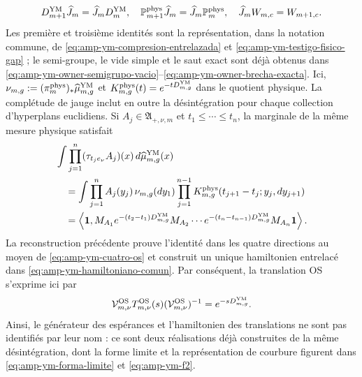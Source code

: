 \begin{equation}\label{eq:pdf2-g-gau-entrelazamiento-dato}
 D_{m+1}^{\rm YM}\widehat J_m=\widehat J_mD_m^{\rm YM},
 \quad
 \mathbb P_{m+1}^{\rm phys}\widehat J_m
  =\widehat J_m\mathbb P_m^{\rm phys},
 \quad
 \widehat J_mW_{m,c}=W_{m+1,c}.
\end{equation}
Les première et troisième identités sont la représentation, dans la notation commune, de \eqref{eq:amp-ym-compresion-entrelazada} et \eqref{eq:amp-ym-testigo-fisico-gap} ; le semi-groupe, le vide simple et le saut exact sont déjà obtenus dans \eqref{eq:amp-ym-owner-semigrupo-vacio}--\eqref{eq:amp-ym-owner-brecha-exacta}. Ici, $\nu_{m,g}:=(\pi_m^{\rm phys})_*\widehat\mu_{m,g}^{\rm YM}$ et $K_{m,g}^{\rm phys}(t)=e^{-tD_{m,g}^{\rm YM}}$ dans le quotient physique. La complétude de jauge inclut en outre la désintégration pour chaque collection d'hyperplans euclidiens. Si $A_j\in\mathfrak A_{+,\nu,m}$ et $t_1\le\cdots\le t_n$, la marginale de la même mesure physique satisfait
\begin{equation}\label{eq:pdf2-g-gau-transfer-euclidean-dato}
\begin{aligned}
 &\int\prod_{j=1}^n
   (\tau_{t_je_\nu}A_j)(x)\,d\widehat\mu_{m,g}^{\rm YM}(x)\\
 &\quad=
 \int\prod_{j=1}^nA_j(y_j)\,
  \nu_{m,g}(dy_1)
  \prod_{j=1}^{n-1}K_{m,g}^{\rm phys}
       (t_{j+1}-t_j;y_j,dy_{j+1})\\
 &\quad=
 \left\langle\mathbf1,
  M_{A_1}e^{-(t_2-t_1)D_{m,g}^{\rm YM}}M_{A_2}\cdots
  e^{-(t_n-t_{n-1})D_{m,g}^{\rm YM}}M_{A_n}\mathbf1
 \right\rangle.
\end{aligned}
\end{equation}
La reconstruction précédente prouve l'identité dans les quatre directions au moyen de \eqref{eq:amp-ym-cuatro-os} et construit un unique hamiltonien entrelacé dans \eqref{eq:amp-ym-hamiltoniano-comun}. Par conséquent, la translation OS s'exprime ici par
\begin{equation}\label{eq:pdf2-g-gau-os-generator-dato}
 \mathcal V_{m,\nu}^{\rm OS}T_{m,\nu}^{\rm OS}(s)
 (\mathcal V_{m,\nu}^{\rm OS})^{-1}
 =e^{-sD_{m,g}^{\rm YM}}.
\end{equation}
Ainsi, le générateur des espérances et l'hamiltonien des translations ne sont pas identifiés par leur nom : ce sont deux réalisations déjà construites de la même désintégration, dont la forme limite et la représentation de courbure figurent dans \eqref{eq:amp-ym-forma-limite} et \eqref{eq:amp-ym-f2}.
